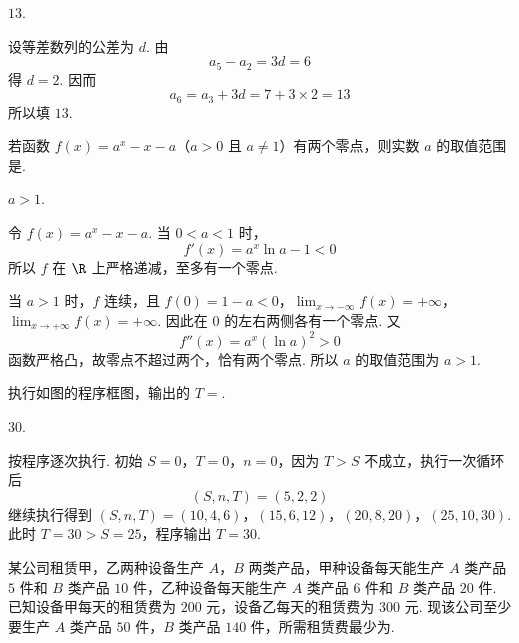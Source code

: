 \begin{answer}
\(13\).
\end{answer}

\begin{solution}
设等差数列的公差为 \(d\). 由
\[
a_5-a_2=3d=6
\]
得 \(d=2\). 因而
\[
a_6=a_3+3d=7+3\times2=13
\]
所以填 \(13\).
\end{solution}

\begin{problem}
若函数 \(f(x) = a^x - x - a\)（\(a > 0\) 且 \(a \neq 1\)）有两个零点，则实数 \(a\) 的取值范围是\fillinblank{}.
\end{problem}

\begin{answer}
\(a > 1\).
\end{answer}

\begin{solution}
令 \(f(x)=a^x-x-a\). 当 \(0<a<1\) 时，
\[
f'(x)=a^x\ln a-1<0
\]
所以 \(f\) 在 \(\R\) 上严格递减，至多有一个零点.

当 \(a>1\) 时，\(f\) 连续，且
\(f(0)=1-a<0\)，\(\lim_{x\to-\infty}f(x)=+\infty\)，\(\lim_{x\to+\infty}f(x)=+\infty\).
因此在 \(0\) 的左右两侧各有一个零点. 又
\[
f''(x)=a^x(\ln a)^2>0
\]
函数严格凸，故零点不超过两个，恰有两个零点. 所以 \(a\) 的取值范围为 \(a>1\).
\end{solution}

\begin{problem}
执行如图的程序框图，输出的 \(T =\)\fillinblank{}.

\end{problem}

\begin{answer}
\(30\).
\end{answer}

\begin{solution}
按程序逐次执行. 初始 \(S=0\)，\(T=0\)，\(n=0\)，因为 \(T>S\) 不成立，执行一次循环后
\[
(S,n,T)=(5,2,2)
\]
继续执行得到
\((S,n,T)=(10,4,6)\)，\((15,6,12)\)，\((20,8,20)\)，\((25,10,30)\).
此时 \(T=30>S=25\)，程序输出 \(T=30\).
\end{solution}

\begin{problem}
某公司租赁甲，乙两种设备生产 \(A\)，\(B\) 两类产品，甲种设备每天能生产 \(A\) 类产品 \(5\) 件和 \(B\) 类产品 \(10\) 件，乙种设备每天能生产 \(A\) 类产品 \(6\) 件和 \(B\) 类产品 \(20\) 件. 已知设备甲每天的租赁费为 \(200\) 元，设备乙每天的租赁费为 \(300\) 元. 现该公司至少要生产 \(A\) 类产品 \(50\) 件，\(B\) 类产品 \(140\) 件，所需租赁费最少为\fillinblank{}.
\end{problem}


